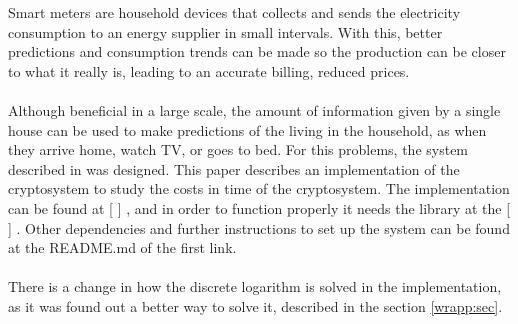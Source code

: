 
   Smart meters are household devices that collects and sends the electricity
   consumption to an energy supplier in small intervals. With this, better
   predictions and consumption trends can be made so the production can be closer to what it really is, leading to an accurate billing, reduced prices.\\
   \\
   Although beneficial in a large scale, the amount of information given by a single house can be used to make predictions of the living in the household, as when they arrive home, watch TV, or goes to bed. For this problems, the system described in \cite{recsi}
   was designed. This paper describes an implementation of the cryptosystem to study the costs in time of the cryptosystem. The implementation can be found at [ ]%
   , and in order to function properly it needs the library at the [ ]
   . Other dependencies and further instructions to set up the system can be found at the README.md of the first link.
   \\\\
   There is a change in how the discrete logarithm is solved in the implementation, as it was found out a better way to solve it, described in
   the section \ref{wrapp:sec}.
   
